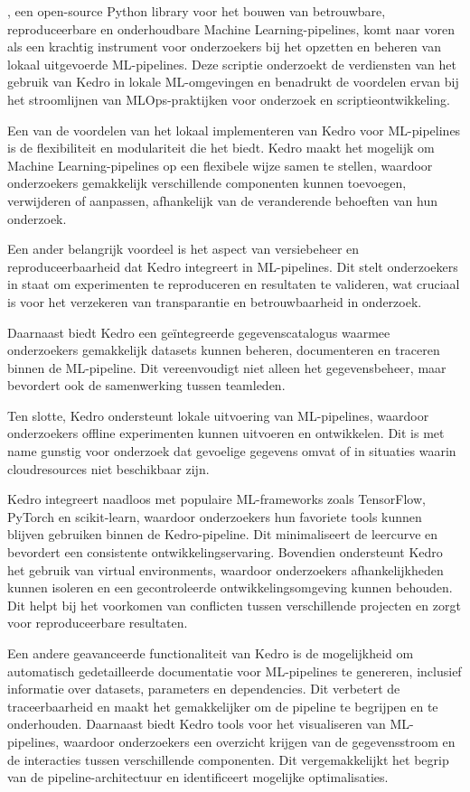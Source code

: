 \autocite{Kedro2024}, een open-source Python library voor het bouwen van betrouwbare, reproduceerbare en onderhoudbare Machine Learning-pipelines, komt naar voren als een krachtig instrument voor onderzoekers bij het opzetten en beheren van lokaal uitgevoerde ML-pipelines. Deze scriptie onderzoekt de verdiensten van het gebruik van Kedro in lokale ML-omgevingen en benadrukt de voordelen ervan bij het stroomlijnen van MLOps-praktijken voor onderzoek en scriptieontwikkeling.

Een van de voordelen van het lokaal implementeren van Kedro voor ML-pipelines is de flexibiliteit en modulariteit die het biedt. Kedro maakt het mogelijk om Machine Learning-pipelines op een flexibele wijze samen te stellen, waardoor onderzoekers gemakkelijk verschillende componenten kunnen toevoegen, verwijderen of aanpassen, afhankelijk van de veranderende behoeften van hun onderzoek.

Een ander belangrijk voordeel is het aspect van versiebeheer en reproduceerbaarheid dat Kedro integreert in ML-pipelines. Dit stelt onderzoekers in staat om experimenten te reproduceren en resultaten te valideren, wat cruciaal is voor het verzekeren van transparantie en betrouwbaarheid in onderzoek.

Daarnaast biedt Kedro een geïntegreerde gegevenscatalogus waarmee onderzoekers gemakkelijk datasets kunnen beheren, documenteren en traceren binnen de ML-pipeline. Dit vereenvoudigt niet alleen het gegevensbeheer, maar bevordert ook de samenwerking tussen teamleden.

Ten slotte, Kedro ondersteunt lokale uitvoering van ML-pipelines, waardoor onderzoekers offline experimenten kunnen uitvoeren en ontwikkelen. Dit is met name gunstig voor onderzoek dat gevoelige gegevens omvat of in situaties waarin cloudresources niet beschikbaar zijn.

Kedro integreert naadloos met populaire ML-frameworks zoals TensorFlow, PyTorch en scikit-learn, waardoor onderzoekers hun favoriete tools kunnen blijven gebruiken binnen de Kedro-pipeline. Dit minimaliseert de leercurve en bevordert een consistente ontwikkelingservaring. Bovendien ondersteunt Kedro het gebruik van virtual environments, waardoor onderzoekers afhankelijkheden kunnen isoleren en een gecontroleerde ontwikkelingsomgeving kunnen behouden. Dit helpt bij het voorkomen van conflicten tussen verschillende projecten en zorgt voor reproduceerbare resultaten.

Een andere geavanceerde functionaliteit van Kedro is de mogelijkheid om automatisch gedetailleerde documentatie voor ML-pipelines te genereren, inclusief informatie over datasets, parameters en dependencies. Dit verbetert de traceerbaarheid en maakt het gemakkelijker om de pipeline te begrijpen en te onderhouden. Daarnaast biedt Kedro tools voor het visualiseren van ML-pipelines, waardoor onderzoekers een overzicht krijgen van de gegevensstroom en de interacties tussen verschillende componenten. Dit vergemakkelijkt het begrip van de pipeline-architectuur en identificeert mogelijke optimalisaties.

